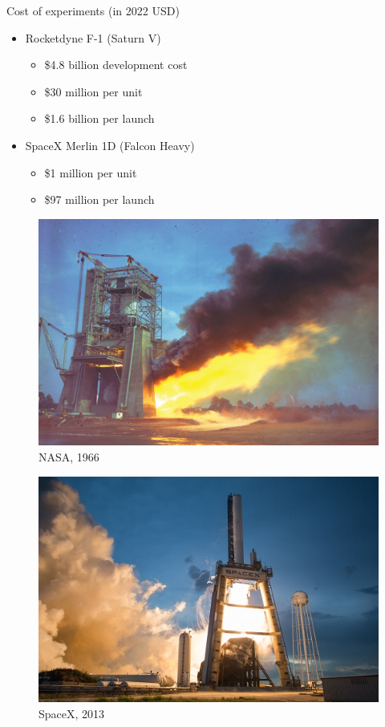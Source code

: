 \documentclass[]{beamer}
\begin{document}
\begin{frame}{Cost of experiments (in 2022 USD)}
    \begin{itemize}
        \item Rocketdyne F-1 (Saturn V)
        \begin{itemize}
            \item \$4.8 billion development cost
            \item \$30 million per unit
            \item \$1.6 billion per launch
        \end{itemize}
        \item SpaceX Merlin 1D (Falcon Heavy)
        \begin{itemize}
            \item \$1 million per unit
            \item \$97 million per launch
        \end{itemize}
    \end{itemize}
	\begin{minipage}{0.49\linewidth}
		\begin{figure}
			\includegraphics[width=0.9\linewidth]{intro/f1TestStand.jpg}
			\caption*{\tiny{NASA, 1966}}
		\end{figure}
	\end{minipage}
	\begin{minipage}{0.49\linewidth}
		\begin{figure}
			\includegraphics[width=0.9\linewidth]{intro/merlin1dTestStand.jpg}
			\caption*{\tiny{SpaceX, 2013}}
		\end{figure}
	\end{minipage}
\end{frame}
\end{document}
